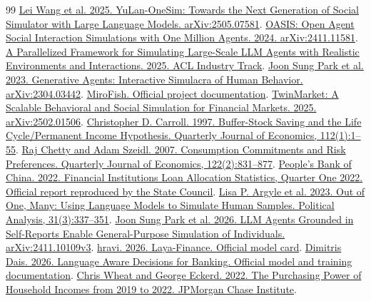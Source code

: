 \documentclass[10pt]{article}
\begin{document}
\begin{thebibliography}{99}
 \href{https://arxiv.org/abs/2505.07581}{Lei Wang et al. 2025. YuLan-OneSim: Towards the Next Generation of Social Simulator with Large Language Models. arXiv:2505.07581}.
 \href{https://arxiv.org/abs/2411.11581}{OASIS: Open Agent Social Interaction Simulations with One Million Agents. 2024. arXiv:2411.11581}.
 \href{https://aclanthology.org/2025.acl-industry.94/}{A Parallelized Framework for Simulating Large-Scale LLM Agents with Realistic Environments and Interactions. 2025. ACL Industry Track}.
 \href{https://arxiv.org/abs/2304.03442}{Joon Sung Park et al. 2023. Generative Agents: Interactive Simulacra of Human Behavior. arXiv:2304.03442}.
 \href{https://github.com/666ghj/MiroFish}{MiroFish. Official project documentation}.
 \href{https://arxiv.org/abs/2502.01506}{TwinMarket: A Scalable Behavioral and Social Simulation for Financial Markets. 2025. arXiv:2502.01506}.
 \href{https://academic.oup.com/qje/article-abstract/112/1/1/1870884}{Christopher D. Carroll. 1997. Buffer-Stock Saving and the Life Cycle/Permanent Income Hypothesis. Quarterly Journal of Economics, 112(1):1–55}.
 \href{https://academic.oup.com/qje/article-abstract/122/2/831/1942152}{Raj Chetty and Adam Szeidl. 2007. Consumption Commitments and Risk Preferences. Quarterly Journal of Economics, 122(2):831–877}.
 \href{https://app.www.gov.cn/govdata/gov/202205/07/484673/article.html}{People’s Bank of China. 2022. Financial Institutions Loan Allocation Statistics, Quarter One 2022. Official report reproduced by the State Council}.
 \href{https://www.cambridge.org/core/journals/political-analysis/article/abs/out-of-one-many-using-language-models-to-simulate-human-samples/035D7C8A55B237942FB6DBAD7CAA4E49}{Lisa P. Argyle et al. 2023. Out of One, Many: Using Language Models to Simulate Human Samples. Political Analysis, 31(3):337–351}.
 \href{https://arxiv.org/abs/2411.10109v3}{Joon Sung Park et al. 2026. LLM Agents Grounded in Self-Reports Enable General-Purpose Simulation of Individuals. arXiv:2411.10109v3}.
 \href{https://huggingface.co/hravi/laya-finance}{hravi. 2026. Laya-Finance. Official model card}.
 \href{https://huggingface.co/dimitrisdais/laya-banking77-typed-decisions}{Dimitris Dais. 2026. Language Aware Decisions for Banking. Official model and training documentation}.
 \href{https://www.jpmorganchase.com/institute/all-topics/labor-markets-and-workforce/household-purchasing-power-2019-to-2022}{Chris Wheat and George Eckerd. 2022. The Purchasing Power of Household Incomes from 2019 to 2022. JPMorgan Chase Institute}.

\end{thebibliography}
\end{document}
